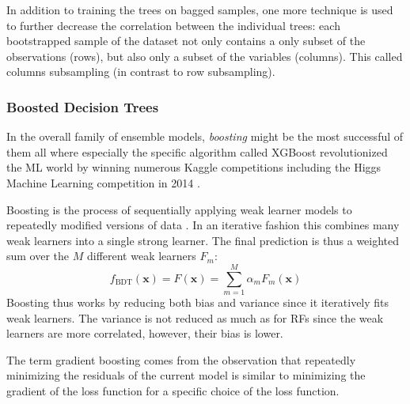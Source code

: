 \documentclass[a4paper, twoside, nobib]{tufte-book}
\newcommand{\autocite}[1]{\citep{#1}}
\renewcommand{\vec}[1]{\mathbf{#1}}
\newcommand{\TODO}{\textcolor{red}{\bf TODO!}\xspace}
\begin{document}
In addition to training the trees on bagged samples, one more technique is used to further decrease the correlation between the individual trees: each bootstrapped sample of the dataset not only contains a only subset of the observations (rows), but also only a subset of the variables (columns). This called columns subsampling (in contrast to row subsampling).


\subsubsection{Boosted Decision Trees}
\label{subsubsec:ml:boosted_decision_trees}
In the overall family of ensemble models, \emph{boosting} might be the most successful of them all where especially the specific algorithm called XGBoost \autocite{chenXGBoostScalableTree2016} revolutionized the ML world by winning numerous Kaggle\sidenote{XXX \TODO} competitions \autocite{DmlcXgboost} including the Higgs Machine Learning competition in \num{2014} \autocite{HEPMeetsML}. 

Boosting is the process of sequentially applying weak learner models to repeatedly modified versions of data \autocite{hastieElementsStatisticalLearning2009}. In an iterative fashion this combines many weak learners into a single strong learner. The final prediction is thus a weighted sum over the $M$ different weak learners $F_m$: 
\begin{equation}
  f_\mathrm{BDT}(\vec{x}) = F(\vec{x}) = \sum_{m=1}^M \alpha_m F_m(\vec{x})
\end{equation}
Boosting thus works by reducing both bias and variance since it iteratively fits weak learners. The variance is not reduced as much as for RFs since the weak learners are more correlated, however, their bias is lower. 

The term gradient boosting comes from the observation that repeatedly minimizing the residuals of the current model is similar to minimizing the gradient of the loss function for a specific choice of the loss function.
\end{document}
